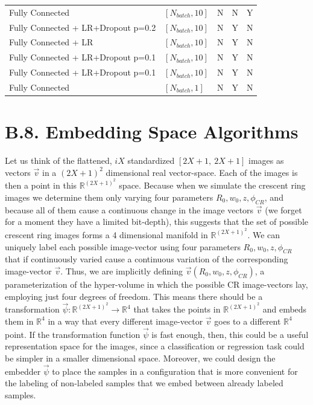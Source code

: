 \documentclass[11pt, a4paper, twoside]{article} %
\newcommand{\R}{\mathbb{R}} %
\begin{document}
\begin{table}[h!]
\begin{tabular}{llccc}
                   Fully Connected  &            $[N_{batch}, 10]$ &         N &         N &                Y \\
 Fully Connected + LR+Dropout p=0.2 &            $[N_{batch}, 10]$ &         N &         Y &                N \\
               Fully Connected + LR &            $[N_{batch}, 10]$ &         N &         Y &                N \\
 Fully Connected + LR+Dropout p=0.1 &            $[N_{batch}, 10]$ &         N &         Y &                N \\
 Fully Connected + LR+Dropout p=0.1 &            $[N_{batch}, 10]$ &         N &         Y &                N \\
                    Fully Connected &             $[N_{batch}, 1]$ &         N &         Y &                N \\
\bottomrule
\end{tabular}
\end{table}
\newpage


\section*{B.8. Embedding Space Algorithms}\vspace{-0.2cm}

Let us think of the flattened, $iX$ standardized $[2X+1,\ 2X+1]$ images as vectors $\vec{v}$ in a $(2X+1)^2$ dimensional real vector-space. Each of the images is then a point in this $\R^{(2X+1)^2}$ space. Because when we simulate the crescent ring images we determine them only varying four parameters $R_0,w_0,z,\phi_{CR}$, and because all of them cause a continuous change in the image vectors $\vec{v}$ (we forget for a moment they have a limited bit-depth), this suggests that the set of possible crescent ring images forms a 4 dimensional manifold in $\R^{(2X+1)^2}$. We can uniquely label each possible image-vector using four parameters $R_0,w_0,z,\phi_{CR}$ that if continuously varied cause a continuous variation of the corresponding image-vector $\vec{v}$. Thus, we are implicitly defining $\vec{v}(R_0,w_0,z,\phi_{CR})$, a parameterization of the hyper-volume in which the possible CR image-vectors lay, employing just four degrees of freedom. This means there should be a transformation $\vec{\psi}:\R^{(2X+1)^2}\rightarrow\R^4$ that takes the points in $\R^{(2X+1)^2}$ and embeds them in $\R^4$ in a way that every different image-vector $\vec{v}$ goes to a different $\R^4$ point. If the transformation function $\vec{\psi}$ is fast enough, then, this could be a useful representation space for the images, since a classification or regression task could be simpler in a smaller dimensional space. Moreover, we could design the embedder $\vec{\psi}$ to place the samples in a configuration that is more convenient for the labeling of non-labeled samples that we embed between already labeled samples.\vspace{-0.3cm}
\end{document}
